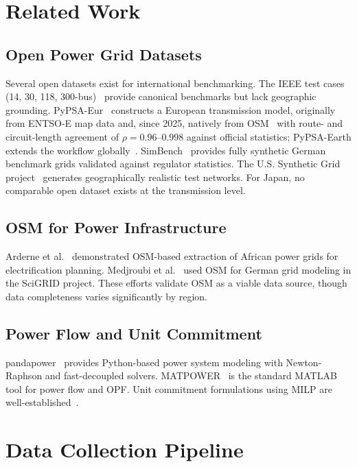 \documentclass[journal]{IEEEtran}
\begin{document}
\section{Related Work}

\subsection{Open Power Grid Datasets}
Several open datasets exist for international benchmarking. The IEEE test cases (14, 30, 118, 300-bus)~\cite{ieee_testcase} provide canonical benchmarks but lack geographic grounding. PyPSA-Eur~\cite{pypsa_eur} constructs a European transmission model, originally from ENTSO-E map data and, since 2025, natively from OSM~\cite{xiong2025} with route- and circuit-length agreement of $\rho=0.96$--$0.998$ against official statistics; PyPSA-Earth extends the workflow globally~\cite{pypsa_earth}. SimBench~\cite{simbench} provides fully synthetic German benchmark grids validated against regulator statistics. The U.S. Synthetic Grid project~\cite{birchfield2017} generates geographically realistic test networks. For Japan, no comparable open dataset exists at the transmission level.

\subsection{OSM for Power Infrastructure}
Arderne et al.~\cite{arderne2020} demonstrated OSM-based extraction of African power grids for electrification planning. Medjroubi et al.~\cite{medjroubi2017} used OSM for German grid modeling in the SciGRID project. These efforts validate OSM as a viable data source, though data completeness varies significantly by region.

\subsection{Power Flow and Unit Commitment}
pandapower~\cite{pandapower} provides Python-based power system modeling with Newton-Raphson and fast-decoupled solvers. MATPOWER~\cite{matpower} is the standard MATLAB tool for power flow and OPF. Unit commitment formulations using MILP are well-established~\cite{padhy2004}.

\section{Data Collection Pipeline}
\end{document}
